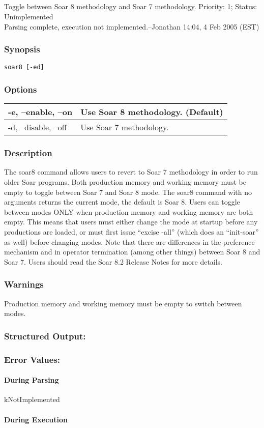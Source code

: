 \subsection{}
\label{soar8}
Toggle between Soar 8 methodology and Soar 7 methodology. 
 Priority: 1; Status: Unimplemented\\ 
Parsing complete, execution not implemented.--Jonathan 14:04, 4 Feb 2005 (EST) 
\subsubsection*{Synopsis}
\begin{verbatim}
soar8 [-ed]
\end{verbatim}
\subsubsection*{Options}
\begin{tabular}{|l|l|}
\hline 
 -e, --enable, --on  & Use Soar 8 methodology. (Default)  \\
 \hline 
 -d, --disable, --off  & Use Soar 7 methodology.  \\
 \hline 
\end{tabular}
\subsubsection*{Description}
 The soar8 command allows users to revert to Soar 7 methodology in order to run older Soar programs. Both production memory and working memory must be empty to toggle between Soar 7 and Soar 8 mode. The soar8 command with no arguments returns the current mode, the default is Soar 8. Users can toggle between modes ONLY when production memory and working memory are both empty. This means that users must either change the mode at startup before any productions are loaded, or must first issue ``excise -all'' (which does an ``init-soar'' as well) before changing modes. Note that there are differences in the preference mechanism and in operator termination (among other things) between Soar 8 and Soar 7. Users should read the Soar 8.2 Release Notes for more details. 
\subsubsection*{Warnings}
 Production memory and working memory must be empty to switch between modes. 
\subsubsection*{Structured Output:}
\subsubsection*{Error Values:}
\paragraph*{During Parsing}
 kNotImplemented
\paragraph*{During Execution}
